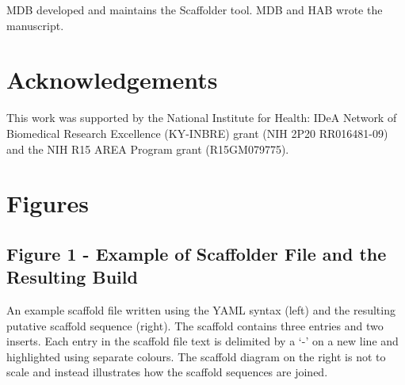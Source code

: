 \documentclass[10pt]{bmc_article}
\newenvironment{bmcformat}{\begin{raggedright}\baselineskip20pt\sloppy\setboolean{publ}{false}}{\end{raggedright}\baselineskip20pt\sloppy}
\begin{document}
\begin{bmcformat}
MDB developed and maintains the Scaffolder tool. MDB and HAB wrote the
manuscript.

\section*{Acknowledgements} %

This work was supported by the National Institute for Health: IDeA Network of
Biomedical Research Excellence (KY-INBRE) grant (NIH 2P20 RR016481-09) and the
NIH R15 AREA Program grant (R15GM079775).

\clearpage

{
   }     %


\clearpage

\section*{Figures} %

\subsection*{Figure 1 - Example of Scaffolder File and the Resulting Build}

An example scaffold file written using the YAML syntax \cite{yaml} (left) and
the resulting putative scaffold sequence (right). The scaffold contains three
entries and two inserts. Each entry in the scaffold file text is delimited by
a `-' on a new line and highlighted using separate colours. The scaffold
diagram on the right is not to scale and instead illustrates how the scaffold
sequences are joined. \pb

\end{bmcformat}
\end{document}
